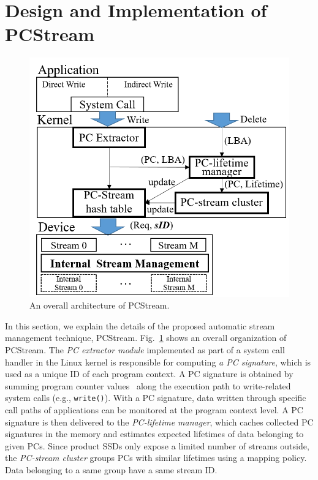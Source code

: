 \section{Design and Implementation of \textsf{PCStream}}

\begin{figure}[b]
	\centering
	\includegraphics[width=0.6\linewidth]{figure/overview}
	\caption{An overall architecture of \textsf{\small PCStream}.}
	\label{fig:architecture}
\end{figure}

In this section, we explain the details of the proposed automatic stream
management technique, \textsf{\small PCStream}.
Fig.~\ref{fig:architecture} shows an overall organization of \textsf{\small
PCStream}. The \textit{PC extractor module} implemented as part of a system
call handler in the Linux kernel is responsible for computing \textit{a PC
signature}, which is used as a unique ID of each program context.  A PC
signature is obtained by summing program counter values~\cite{PC} along the
execution path to write-related system calls (e.g., {\tt write()}).  With a PC
signature, data written through specific call paths of applications can be
monitored at the program context level.  A PC signature is then delivered to
the \textit{PC-lifetime manager}, which caches collected PC signatures in the
memory and estimates expected lifetimes of data belonging to given PCs.  Since
product SSDs only expose a limited number of streams outside, the
\textit{PC-stream cluster} groups PCs with similar lifetimes using a mapping
policy. Data belonging to a same group have a same stream ID.

